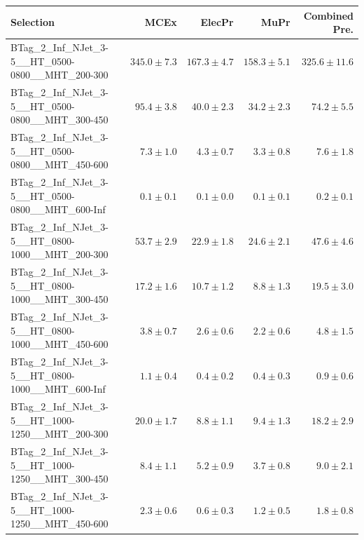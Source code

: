 \documentclass{beamer}
\begin{document}
\begin{frame}
\tiny
\begin{tabular}{lrrrr}
\toprule

                                                Selection  &                     MCEx  &           ElecPr  &             MuPr  &          Combined Pre.  \\ 
\midrule
  BTag\_2\_Inf\_NJet\_3-5\_\_HT\_0500-0800\_\_MHT\_200-300 &             $345.0\pm7.3$&             $167.3\pm4.7$&             $158.3\pm5.1$&                $325.6\pm11.6$ \\ 
 BTag\_2\_Inf\_NJet\_3-5\_\_HT\_0500-0800\_\_MHT\_300-450 &              $95.4\pm3.8$&              $40.0\pm2.3$&              $34.2\pm2.3$&                  $74.2\pm5.5$ \\ 
 BTag\_2\_Inf\_NJet\_3-5\_\_HT\_0500-0800\_\_MHT\_450-600 &               $7.3\pm1.0$&               $4.3\pm0.7$&               $3.3\pm0.8$&                   $7.6\pm1.8$ \\ 
 BTag\_2\_Inf\_NJet\_3-5\_\_HT\_0500-0800\_\_MHT\_600-Inf &               $0.1\pm0.1$&               $0.1\pm0.0$&               $0.1\pm0.1$&                   $0.2\pm0.1$ \\ 
 BTag\_2\_Inf\_NJet\_3-5\_\_HT\_0800-1000\_\_MHT\_200-300 &              $53.7\pm2.9$&              $22.9\pm1.8$&              $24.6\pm2.1$&                  $47.6\pm4.6$ \\ 
 BTag\_2\_Inf\_NJet\_3-5\_\_HT\_0800-1000\_\_MHT\_300-450 &              $17.2\pm1.6$&              $10.7\pm1.2$&               $8.8\pm1.3$&                  $19.5\pm3.0$ \\ 
 BTag\_2\_Inf\_NJet\_3-5\_\_HT\_0800-1000\_\_MHT\_450-600 &               $3.8\pm0.7$&               $2.6\pm0.6$&               $2.2\pm0.6$&                   $4.8\pm1.5$ \\ 
 BTag\_2\_Inf\_NJet\_3-5\_\_HT\_0800-1000\_\_MHT\_600-Inf &               $1.1\pm0.4$&               $0.4\pm0.2$&               $0.4\pm0.3$&                   $0.9\pm0.6$ \\ 
 BTag\_2\_Inf\_NJet\_3-5\_\_HT\_1000-1250\_\_MHT\_200-300 &              $20.0\pm1.7$&               $8.8\pm1.1$&               $9.4\pm1.3$&                  $18.2\pm2.9$ \\ 
 BTag\_2\_Inf\_NJet\_3-5\_\_HT\_1000-1250\_\_MHT\_300-450 &               $8.4\pm1.1$&               $5.2\pm0.9$&               $3.7\pm0.8$&                   $9.0\pm2.1$ \\ 
 BTag\_2\_Inf\_NJet\_3-5\_\_HT\_1000-1250\_\_MHT\_450-600 &               $2.3\pm0.6$&               $0.6\pm0.3$&               $1.2\pm0.5$&                   $1.8\pm0.8$ \\ 

\end{tabular}
\end{frame}
\end{document}
